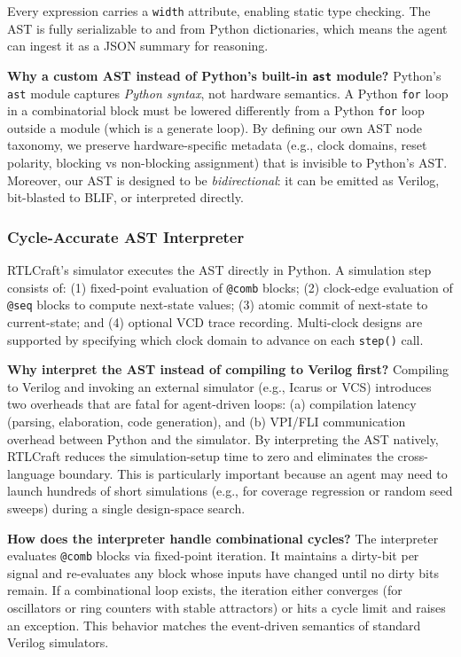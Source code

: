 \documentclass[11pt]{article}
\begin{document}
Every expression carries a \texttt{width} attribute, enabling static type checking. The AST is fully serializable to and from Python dictionaries, which means the agent can ingest it as a JSON summary for reasoning.

\textbf{Why a custom AST instead of Python's built-in \texttt{ast} module?} Python's \texttt{ast} module captures \textit{Python syntax}, not hardware semantics. A Python \texttt{for} loop in a combinatorial block must be lowered differently from a Python \texttt{for} loop outside a module (which is a generate loop). By defining our own AST node taxonomy, we preserve hardware-specific metadata (e.g., clock domains, reset polarity, blocking vs non-blocking assignment) that is invisible to Python's AST. Moreover, our AST is designed to be \textit{bidirectional}: it can be emitted as Verilog, bit-blasted to BLIF, or interpreted directly.

\subsubsection{Cycle-Accurate AST Interpreter}

RTLCraft's simulator executes the AST directly in Python. A simulation step consists of: (1) fixed-point evaluation of \texttt{@comb} blocks; (2) clock-edge evaluation of \texttt{@seq} blocks to compute next-state values; (3) atomic commit of next-state to current-state; and (4) optional VCD trace recording. Multi-clock designs are supported by specifying which clock domain to advance on each \texttt{step()} call.

\textbf{Why interpret the AST instead of compiling to Verilog first?} Compiling to Verilog and invoking an external simulator (e.g., Icarus or VCS) introduces two overheads that are fatal for agent-driven loops: (a) compilation latency (parsing, elaboration, code generation), and (b) VPI/FLI communication overhead between Python and the simulator. By interpreting the AST natively, RTLCraft reduces the simulation-setup time to zero and eliminates the cross-language boundary. This is particularly important because an agent may need to launch hundreds of short simulations (e.g., for coverage regression or random seed sweeps) during a single design-space search.

\textbf{How does the interpreter handle combinational cycles?} The interpreter evaluates \texttt{@comb} blocks via fixed-point iteration. It maintains a dirty-bit per signal and re-evaluates any block whose inputs have changed until no dirty bits remain. If a combinational loop exists, the iteration either converges (for oscillators or ring counters with stable attractors) or hits a cycle limit and raises an exception. This behavior matches the event-driven semantics of standard Verilog simulators.
\end{document}
